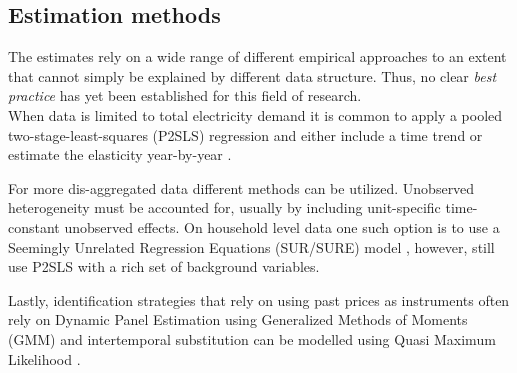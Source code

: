 \subsection{Estimation methods}
\label{subsec:b_estimation}
The estimates rely on a wide range of different empirical approaches to an extent that cannot simply be explained by different data structure. Thus, no clear \textit{best practice} has yet been established for this field of research.
\medskip\\
When data is limited to total electricity demand it is common to apply a pooled two-stage-least-squares (P2SLS) regression and either include a time trend \citep{lijesen2007real} or estimate the elasticity year-by-year \citep{bonte2015price}.
\par
For more dis-aggregated data different methods can be utilized. Unobserved heterogeneity must be accounted for, usually by including unit-specific time-constant unobserved effects. On household level data one such option is to use a Seemingly Unrelated Regression Equations (SUR/SURE) model \citep{vesterberg2014residential}, however, \citet{alberini2019response} still use P2SLS with a rich set of background variables.
\par
Lastly, identification strategies that rely on using past prices as instruments often rely on Dynamic Panel Estimation using Generalized Methods of Moments (GMM) \citep{genc2016measuring} and intertemporal substitution can be modelled using Quasi Maximum Likelihood \citep{wolak2001impact}.
